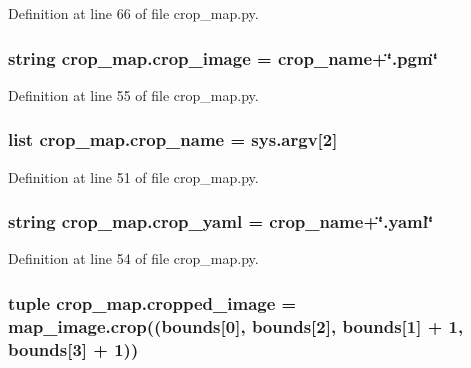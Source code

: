 Definition at line 66 of file crop\-\_\-map.\-py.

\hypertarget{namespacecrop__map_a07069eafc6d8c8f341771d2ac8bbf616}{
\subsubsection[{crop\-\_\-image}]{\setlength{\rightskip}{0pt plus 5cm}string crop\-\_\-map.\-crop\-\_\-image = {\bf crop\-\_\-name}+\char`\"{}.pgm\char`\"{}}}\label{namespacecrop__map_a07069eafc6d8c8f341771d2ac8bbf616}


Definition at line 55 of file crop\-\_\-map.\-py.

\hypertarget{namespacecrop__map_addfc4aa986e764d9ad40aa6109771415}{
\subsubsection[{crop\-\_\-name}]{\setlength{\rightskip}{0pt plus 5cm}list crop\-\_\-map.\-crop\-\_\-name = sys.\-argv\mbox{[}2\mbox{]}}}\label{namespacecrop__map_addfc4aa986e764d9ad40aa6109771415}


Definition at line 51 of file crop\-\_\-map.\-py.

\hypertarget{namespacecrop__map_a087380cbd829f0b2fad3fe1840a484ef}{
\subsubsection[{crop\-\_\-yaml}]{\setlength{\rightskip}{0pt plus 5cm}string crop\-\_\-map.\-crop\-\_\-yaml = {\bf crop\-\_\-name}+\char`\"{}.yaml\char`\"{}}}\label{namespacecrop__map_a087380cbd829f0b2fad3fe1840a484ef}


Definition at line 54 of file crop\-\_\-map.\-py.

\hypertarget{namespacecrop__map_a2f013a29ad592b823d543b8efc8bc9ae}{
\subsubsection[{cropped\-\_\-image}]{\setlength{\rightskip}{0pt plus 5cm}tuple crop\-\_\-map.\-cropped\-\_\-image = map\-\_\-image.\-crop(({\bf bounds}\mbox{[}0\mbox{]}, {\bf bounds}\mbox{[}2\mbox{]}, {\bf bounds}\mbox{[}1\mbox{]} + 1, {\bf bounds}\mbox{[}3\mbox{]} + 1))}}\label{namespacecrop__map_a2f013a29ad592b823d543b8efc8bc9ae}



